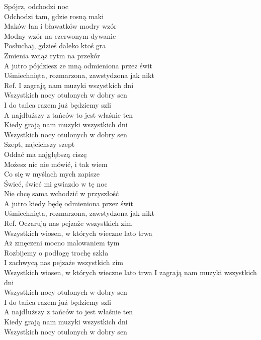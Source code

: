 
Spójrz, odchodzi noc  \tab{} \tab{}  \\
Odchodzi tam, gdzie rosną maki  \tab{}   \\
Maków łan i bławatków modry wzór  \tab{}  \\
Modny wzór na czerwonym dywanie  \tab{}  \\
Posłuchaj, gdzieś daleko ktoś gra  \tab{}  \\
Zmienia wciąż rytm na przekór  \tab{}  \\
A jutro pójdziesz ze mną odmieniona przez świt    \\
Uśmiechnięta, rozmarzona, zawstydzona jak nikt   \\
\hops
Ref. I zagrają nam muzyki wszystkich dni  \tab{}   \\
 Wszystkich nocy otulonych w dobry sen  \tab{}   \\
 I do tańca razem już będziemy szli  \tab{}  \\
 A najdłuższy z tańców to jest właśnie ten   \\
 Kiedy grają nam muzyki wszystkich dni  \tab{}  \\
 Wszystkich nocy otulonych w dobry sen  \tab{} \\
\hops
Szept, najcichszy szept \\
Oddać ma najgłębszą ciszę \\
Możesz nic nie mówić, i tak wiem \\
Co się w myślach mych zapisze \\
Świeć, świeć mi gwiazdo w tę noc \\
Nie chcę sama wchodzić w przyszłość \\
A jutro kiedy będę odmieniona przez świt \\
Uśmiechnięta, rozmarzona, zawstydzona jak nikt \\
\hops
Ref. Oczarują nas pejzaże wszystkich zim \\
 Wszystkich wiosen, w których wieczne lato trwa \\
 Aż zmęczeni mocno malowaniem tym \\
 Rozbijemy o podłogę trochę szkła \\
 I zachwycą nas pejzaże wszystkich zim \\
 Wszystkich wiosen, w których wieczne lato trwa
\hop
{} I zagrają nam muzyki wszystkich dni  \\
 Wszystkich nocy otulonych w dobry sen  \\
 I do tańca razem już będziemy szli  \\
 A najdłuższy z tańców to jest właśnie ten  \\
 Kiedy grają nam muzyki wszystkich dni  \\
 Wszystkich nocy otulonych w dobry sen
